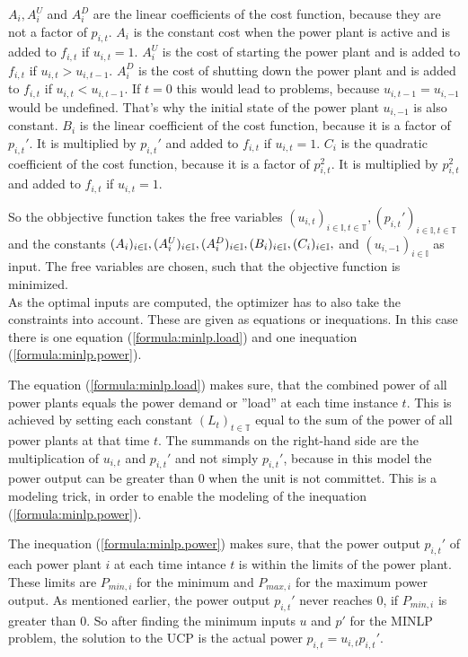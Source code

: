 $A_i, A_i^U$ and $A_i^D$ are the linear coefficients of the cost function,
because they are not a factor of $p_{i, t}$.
$A_i$ is the constant cost when the power plant is active
and is added to $f_{i, t}$ if $u_{i, t} = 1$.
$A_i^U$ is the cost of starting the power plant
and is added to $f_{i, t}$ if $u_{i, t} > u_{i, t-1}$.
$A_i^D$ is the cost of shutting down the power plant
and is added to $f_{i, t}$ if $u_{i, t} < u_{i, t-1}$.
If $t = 0$ this would lead to problems, because $u_{i, t-1} = u_{i, -1}$ would be undefined.
That's why the initial state of the power plant $u_{i, -1}$ is also constant.
$B_i$ is the linear coefficient of the cost function,
because it is a factor of $p_{i, t}'$.
It is multiplied by $p_{i, t}'$ and added to $f_{i, t}$ if $u_{i,  t} = 1$.
$C_i$ is the quadratic coefficient of the cost function,
because it is a factor of $p_{i, t}^2$.
It is multiplied by $p_{i, t}^2$ and added to $f_{i, t}$ if $u_{i,  t} = 1$.

So the obbjective function takes the free variables
$
(u_{i, t})_{i \in \mathbb{I}, t \in \mathbb{T}},
(p_{i, t}')_{i \in \mathbb{I}, t \in \mathbb{T}}
$ and the constants $
(A_i)_{i \in \mathbb{I}}, \\
(A_i^U)_{i \in \mathbb{I}},
(A_i^D)_{i \in \mathbb{I}},
(B_i)_{i \in \mathbb{I}},
(C_i)_{i \in \mathbb{I}},
$ and $
(u_{i, -1})_{i \in \mathbb{I}}
$ as input.
The free variables are chosen, such that the objective function is minimized.
\\

As the optimal inputs are computed, the optimizer has to also take the constraints into account.
These are given as equations or inequations.
In this case there is one equation (\ref{formula:minlp.load}) and one inequation (\ref{formula:minlp.power}).

The equation (\ref{formula:minlp.load}) makes sure, that the combined power
of all power plants equals the power demand or ''load'' at each time instance $t$.
This is achieved by setting each constant $(L_t)_{t \in \mathbb{T}}$
equal to the sum of the power of all power plants at that time $t$.
The summands on the right-hand side are the multiplication of
$u_{i, t}$ and $p_{i, t}'$ and not simply $p_{i, t}'$,
because in this model the power output can be greater than 0
when the unit is not committet.
This is a modeling trick, in order to enable the modeling of the inequation (\ref{formula:minlp.power}).

The inequation (\ref{formula:minlp.power}) makes sure, that the power output $p_{i, t}'$
of each power plant $i$ at each time intance $t$ is within the limits of the power plant.
These limits are $P_{min, i}$ for the minimum and $P_{max, i}$ for the maximum
power output.
As mentioned earlier, the power output $p_{i, t}'$ never reaches 0,
if $P_{min, i}$ is greater than 0.
So after finding the minimum inputs $u$ and $p'$ for the MINLP problem,
the solution to the UCP is the actual power $p_{i, t} = u_{i, t} p_{i, t}'$.
